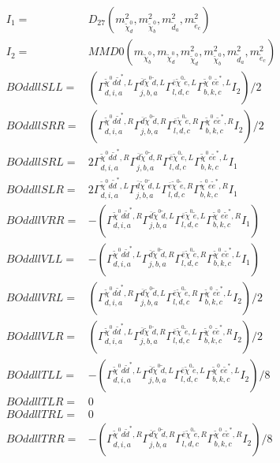 \documentclass[A4,landscape]{article}
\begin{document}
\begin{align} 
I_1 = & D_{27}(m^2_{\tilde{\chi}^0_{{d}}}, m^2_{\tilde{\chi}^0_{{b}}}, m^2_{\tilde{d}_{{a}}}, m^2_{\tilde{e}_{{c}}}) \\ 
I_2 = & MMD0(m_{\tilde{\chi}^0_{{b}}}, m_{\tilde{\chi}^0_{{d}}}, m^2_{\tilde{\chi}^0_{{d}}}, m^2_{\tilde{\chi}^0_{{b}}}, m^2_{\tilde{d}_{{a}}}, m^2_{\tilde{e}_{{c}}}) \\ 
  BOddllSLL= & ( \Gamma^{\tilde{\chi}^0 d \tilde{d}^*,L}_{d, i, a} \Gamma^{\bar{d}\tilde{\chi}^0 \tilde{d} ,L}_{j, b, a} \Gamma^{\bar{e}\tilde{\chi}^0 \tilde{e} ,L}_{l, d, c} \Gamma^{\tilde{\chi}^0 e \tilde{e}^*,L}_{b, k, c} I_2)/2 \\ 
  BOddllSRR= & ( \Gamma^{\tilde{\chi}^0 d \tilde{d}^*,R}_{d, i, a} \Gamma^{\bar{d}\tilde{\chi}^0 \tilde{d} ,R}_{j, b, a} \Gamma^{\bar{e}\tilde{\chi}^0 \tilde{e} ,R}_{l, d, c} \Gamma^{\tilde{\chi}^0 e \tilde{e}^*,R}_{b, k, c} I_2)/2 \\ 
  BOddllSRL= & 2  \Gamma^{\tilde{\chi}^0 d \tilde{d}^*,R}_{d, i, a} \Gamma^{\bar{d}\tilde{\chi}^0 \tilde{d} ,R}_{j, b, a} \Gamma^{\bar{e}\tilde{\chi}^0 \tilde{e} ,L}_{l, d, c} \Gamma^{\tilde{\chi}^0 e \tilde{e}^*,L}_{b, k, c} I_1 \\ 
  BOddllSLR= & 2  \Gamma^{\tilde{\chi}^0 d \tilde{d}^*,L}_{d, i, a} \Gamma^{\bar{d}\tilde{\chi}^0 \tilde{d} ,L}_{j, b, a} \Gamma^{\bar{e}\tilde{\chi}^0 \tilde{e} ,R}_{l, d, c} \Gamma^{\tilde{\chi}^0 e \tilde{e}^*,R}_{b, k, c} I_1 \\ 
  BOddllVRR= & -( \Gamma^{\tilde{\chi}^0 d \tilde{d}^*,R}_{d, i, a} \Gamma^{\bar{d}\tilde{\chi}^0 \tilde{d} ,L}_{j, b, a} \Gamma^{\bar{e}\tilde{\chi}^0 \tilde{e} ,L}_{l, d, c} \Gamma^{\tilde{\chi}^0 e \tilde{e}^*,R}_{b, k, c} I_1) \\ 
  BOddllVLL= & -( \Gamma^{\tilde{\chi}^0 d \tilde{d}^*,L}_{d, i, a} \Gamma^{\bar{d}\tilde{\chi}^0 \tilde{d} ,R}_{j, b, a} \Gamma^{\bar{e}\tilde{\chi}^0 \tilde{e} ,R}_{l, d, c} \Gamma^{\tilde{\chi}^0 e \tilde{e}^*,L}_{b, k, c} I_1) \\ 
  BOddllVRL= & ( \Gamma^{\tilde{\chi}^0 d \tilde{d}^*,R}_{d, i, a} \Gamma^{\bar{d}\tilde{\chi}^0 \tilde{d} ,L}_{j, b, a} \Gamma^{\bar{e}\tilde{\chi}^0 \tilde{e} ,R}_{l, d, c} \Gamma^{\tilde{\chi}^0 e \tilde{e}^*,L}_{b, k, c} I_2)/2 \\ 
  BOddllVLR= & ( \Gamma^{\tilde{\chi}^0 d \tilde{d}^*,L}_{d, i, a} \Gamma^{\bar{d}\tilde{\chi}^0 \tilde{d} ,R}_{j, b, a} \Gamma^{\bar{e}\tilde{\chi}^0 \tilde{e} ,L}_{l, d, c} \Gamma^{\tilde{\chi}^0 e \tilde{e}^*,R}_{b, k, c} I_2)/2 \\ 
  BOddllTLL= & -( \Gamma^{\tilde{\chi}^0 d \tilde{d}^*,L}_{d, i, a} \Gamma^{\bar{d}\tilde{\chi}^0 \tilde{d} ,L}_{j, b, a} \Gamma^{\bar{e}\tilde{\chi}^0 \tilde{e} ,L}_{l, d, c} \Gamma^{\tilde{\chi}^0 e \tilde{e}^*,L}_{b, k, c} I_2)/8 \\ 
  BOddllTLR= & 0 \\ 
  BOddllTRL= & 0 \\ 
  BOddllTRR= & -( \Gamma^{\tilde{\chi}^0 d \tilde{d}^*,R}_{d, i, a} \Gamma^{\bar{d}\tilde{\chi}^0 \tilde{d} ,R}_{j, b, a} \Gamma^{\bar{e}\tilde{\chi}^0 \tilde{e} ,R}_{l, d, c} \Gamma^{\tilde{\chi}^0 e \tilde{e}^*,R}_{b, k, c} I_2)/8 \\ 
\end{align} 
\end{document}
